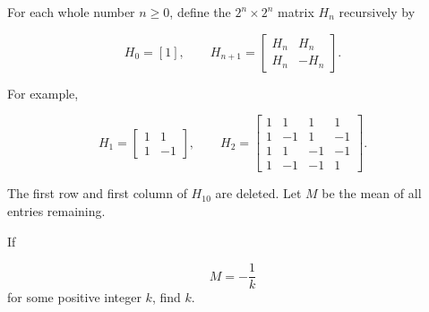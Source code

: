 For each whole number $n\geq 0$, define the $2^n\times 2^n$ matrix $H_n$ recursively by

\[
H_0=[1],
\qquad
H_{n+1}=
\begin{bmatrix}
H_n & H_n\\
H_n & -H_n
\end{bmatrix}.
\]

For example,

\[
H_1=
\begin{bmatrix}
1 & 1\\
1 & -1
\end{bmatrix},
\qquad
H_2=
\begin{bmatrix}
1 & 1 & 1 & 1\\
1 & -1 & 1 & -1\\
1 & 1 & -1 & -1\\
1 & -1 & -1 & 1
\end{bmatrix}.
\]

The first row and first column of $H_{10}$ are deleted. Let $M$ be the mean of all entries remaining.

If

\[
M=-\dfrac{1}{k}
\]for some positive integer $k$, find $k$.
